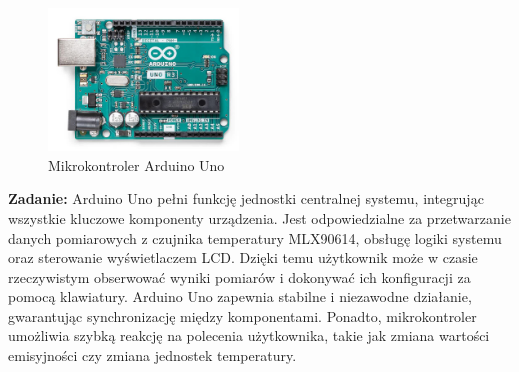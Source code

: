     \vspace{12pt}

    \begin{figure}[h!]
        \centering
        \includegraphics[width=0.45\textwidth]{images/uno.jpg}
        \caption{Mikrokontroler Arduino Uno \cite{5}}
        \label{fig:uno}
    \end{figure}

    \vspace{12pt}

\textbf{Zadanie:} Arduino Uno pełni funkcję jednostki centralnej systemu, integrując wszystkie kluczowe komponenty urządzenia. Jest odpowiedzialne za przetwarzanie danych pomiarowych z czujnika temperatury MLX90614, obsługę logiki systemu oraz sterowanie wyświetlaczem LCD. Dzięki temu użytkownik może w czasie rzeczywistym obserwować wyniki pomiarów i dokonywać ich konfiguracji za pomocą klawiatury. Arduino Uno zapewnia stabilne i niezawodne działanie, gwarantując synchronizację między komponentami. Ponadto, mikrokontroler umożliwia szybką reakcję na polecenia użytkownika, takie jak zmiana wartości emisyjności czy zmiana jednostek temperatury.


\vspace{12pt}


